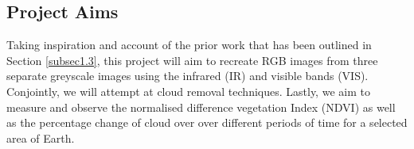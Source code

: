 \subsection{Project Aims}\label{subsec1.4}

Taking inspiration and account of the prior work that has been outlined in Section \ref{subsec1.3}, this project will aim to recreate RGB images from three separate greyscale images using the infrared (IR) and visible bands (VIS). Conjointly, we will attempt at cloud removal techniques. Lastly, we aim to measure  and observe the normalised difference vegetation Index (NDVI) as well as the percentage change of cloud over over different periods of time for a selected area of Earth.



